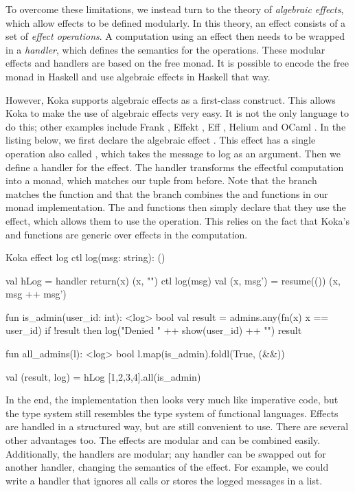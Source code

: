 To overcome these limitations, we instead turn to the theory of \emph{algebraic effects}, which allow effects to be defined modularly. In this theory, an effect consists of a set of \emph{effect operations}. A computation using an effect then needs to be wrapped in a \emph{handler}, which defines the semantics for the operations. These modular effects and handlers are based on the free monad. It is possible to encode the free monad in Haskell and use algebraic effects in Haskell that way.

However, Koka supports algebraic effects as a first-class construct. This allows Koka to make the use of algebraic effects very easy. It is not the only language to do this; other examples include Frank \autocite{lindley_be_2017}, Effekt \autocite{bach_poulsen_hefty_2023}, Eff \autocite{bauer_programming_2015}, Helium \autocite{biernacki_abstracting_2019} and OCaml \autocite{sivaramakrishnan_retrofitting_2021}. In the listing below, we first declare the algebraic effect . This effect has a single operation also called , which takes the message to log as an argument. Then we define a handler  for the  effect. The handler transforms the effectful computation into a monad, which matches our tuple from before. Note that the  branch matches the  function and that the  branch combines the  and  functions in our monad implementation. The  and  functions then simply declare that they use the  effect, which allows them to use the  operation. This relies on the fact that Koka's  and  functions are generic over effects in the computation.

\begin{lst}{Koka}
effect log
  ctl log(msg: string): ()
  
val hLog = handler
  return(x) (x, "")
  ctl log(msg)
    val (x, msg') = resume(())
    (x, msg ++ msg')
  
fun is_admin(user_id: int): <log> bool
  val result = admins.any(fn(x) x == user_id)
  if !result then
    log("Denied " ++ show(user_id) ++ "\n")
  result
 
fun all_admins(l): <log> bool
  l.map(is_admin).foldl(True, (&&))
  
val (result, log) = hLog { [1,2,3,4].all(is_admin) }
\end{lst}
%
In the end, the implementation then looks very much like imperative code, but the type system still resembles the type system of functional languages. Effects are handled in a structured way, but are still convenient to use. There are several other advantages too. The effects are modular and can be combined easily. Additionally, the handlers are modular; any handler can be swapped out for another handler, changing the semantics of the effect. For example, we could write a handler that ignores all  calls or stores the logged messages in a list.

